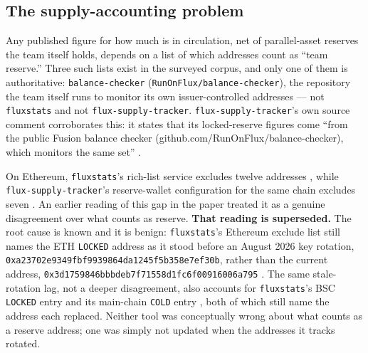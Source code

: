 \subsection{The supply-accounting problem}
\label{sec:pa-supply-accounting}

Any published figure for how much \flux is in circulation, net of parallel-asset reserves the team
itself holds, depends on a list of which addresses count as ``team reserve.'' Three such lists exist
in the surveyed corpus, and only one of them is authoritative: \texttt{balance-\allowbreak{}checker}
(\texttt{RunOnFlux/\allowbreak{}balance-checker}), the repository the team itself runs to monitor its own
issuer-controlled addresses \shipped {} --- not
\texttt{fluxstats} and not \texttt{flux-\allowbreak{}supply-\allowbreak{}tracker}. \texttt{flux-\allowbreak{}supply-\allowbreak{}tracker}'s own source
comment corroborates this: it states that its locked-reserve figures come ``from the public Fusion
balance checker (github.com/RunOnFlux/balance-checker), which monitors the same set''
\shipped {}.

On Ethereum, \texttt{fluxstats}'s rich-list service excludes twelve addresses
\shipped {}, while
\texttt{flux-\allowbreak{}supply-\allowbreak{}tracker}'s reserve-wallet configuration for the same chain excludes seven
\shipped {}. An earlier reading of this gap in the
paper treated it as a genuine disagreement over what counts as reserve. \textbf{That reading is
superseded.} The root cause is known and it is benign: \texttt{fluxstats}'s Ethereum exclude list
still names the ETH \texttt{LOCKED} address as it stood before an August 2026 key rotation,
\texttt{0xa23702e9349fbf\allowbreak{}9939864da1245f5b\allowbreak{}358e7ef30b}, rather than the current address,
\texttt{0x3d1759846bbbde\allowbreak{}b7f71558d1fc6f00\allowbreak{}916006a795}
\shipped {}
. The same stale-rotation lag, not a deeper
disagreement, also accounts for \texttt{fluxstats}'s BSC \texttt{LOCKED} entry
\shipped {} and its \Flux main-chain
\texttt{COLD} entry \shipped {}, both of which
still name the address each replaced. Neither tool was conceptually wrong about what counts as a
reserve address; one was simply not updated when the addresses it tracks rotated.

